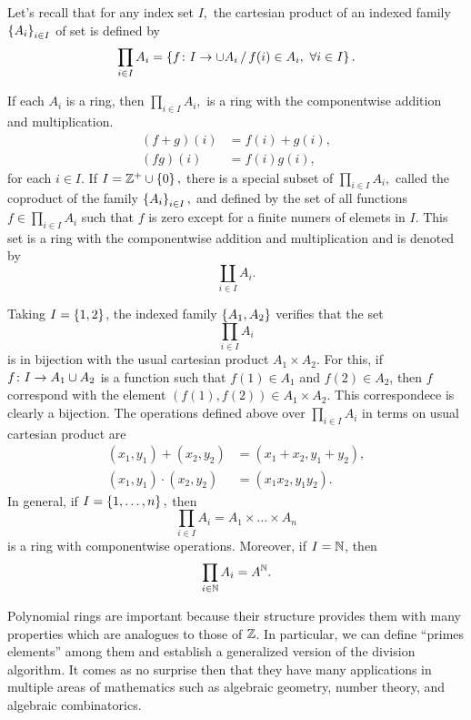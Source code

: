 \documentclass[11pt,a4paper]{article}
\begin{document}
\begin{exa}
Let's recall that for any index set $I,$ the cartesian product of an indexed family $\left\lbrace A_i \right\rbrace_{i\in I}$ of set is defined by
\[\prod_{i\in I} A_i=\left\lbrace f\colon I \to \cup A_i\, /\, f(i)\in A_i,\,\, \forall i\in I \right\rbrace.\]

If each $A_i$ is a ring, then $\prod_{i\in I} A_i,$  is a ring with the componentwise addition and multiplication. 
\begin{align*}
    (f+g)(i)&=f(i)+g(i),\\
    (fg)(i)&=f(i)g(i),
\end{align*}
for each $i\in I$. If $I=\mathbb{Z}^{+}\cup\left\lbrace 0 \right\rbrace,$ there is a special subset of $\prod_{i\in I} A_i,$ called the coproduct of the family $\left\lbrace A_i \right\rbrace_{i\in I},$ and defined by the set of all functions $f\in \prod_{i\in I} A_i$ such that $f$ is zero except for a finite numers of elemets in $I$. This set is a ring with the componentwise addition and multiplication and is denoted by \[\coprod_{i\in I} A_i.\]
\end{exa}

\begin{exa}
    Taking $I=\left\lbrace 1,2 \right\rbrace$, the indexed family $\left\lbrace A_1,A_2 \right\rbrace$ verifies that the set
    \[\prod_{i\in I} A_i \] is in bijection with the usual cartesian product \(A_1\times A_2.\)
    For this, if $f\colon I \to A_1\cup A_2$ is a function such that $f(1)\in A_1$ and $f(2)\in A_2$, then $f$ correspond with the element $(f(1),f(2))\in A_1\times A_2$. This correspondece is clearly a bijection. The operations defined above over $\prod_{i\in I} A_i$ in terms on usual cartesian product are
    \begin{align*}
    (x_1,y_1) + (x_2,y_2) &= (x_1+x_2, y_1+y_2),\\
    (x_1,y_1) \cdot (x_2,y_2) &= (x_1 x_2, y_1 y_2).
    \end{align*}
 In general, if $I=\left\lbrace 1,\ldots,n \right\rbrace,$ then \[\prod_{i\in I} A_i = A_1\times\ldots \times A_n\]
is a ring with componentwise operations. Moreover, if $I=\mathbb{N}$, then 
\[\prod_{i\in\mathbb{N}} A_i = A^{\mathbb{N}}.\]
\end{exa}


	\begin{rem}
	Polynomial rings are important because their structure provides them with many properties which are analogues to those of $\mathbb{Z}$. In particular, we can define ``primes elements'' among them and establish a generalized version of the division algorithm. It comes as no surprise then that they have many applications in multiple areas of mathematics such as algebraic geometry, number theory, and algebraic combinatorics.
\end{rem}
\end{document}
